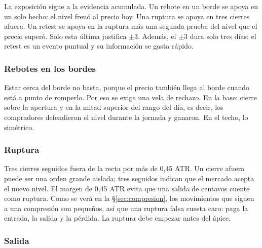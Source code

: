 \documentclass[10pt,a4paper]{article}
\begin{document}
La exposición sigue a la evidencia acumulada. Un rebote en un borde se apoya en un solo
hecho: el nivel frenó al precio hoy. Una ruptura se apoya en tres cierres afuera. Un
retest se apoya en la ruptura más una segunda prueba del nivel que el precio superó.
Solo esta última justifica $\pm3$. Además, el $\pm3$ dura solo tres días: el retest es
un evento puntual y su información se gasta rápido.

\subsubsection{Rebotes en los bordes}

Estar cerca del borde no basta, porque el precio también llega al borde cuando está a
punto de romperlo. Por eso se exige una vela de rechazo. En la base: cierre sobre la
apertura y en la mitad superior del rango del día, es decir, los compradores
defendieron el nivel durante la jornada y ganaron. En el techo, lo simétrico.

\subsubsection{Ruptura}

Tres cierres seguidos fuera de la recta por más de 0,45 ATR. Un cierre afuera puede ser
una orden grande aislada; tres seguidos indican que el mercado acepta el nuevo nivel. El
margen de 0,45 ATR evita que una salida de centavos cuente como ruptura. Como se verá en
la §\ref{sec:compresion}, los movimientos que siguen a una compresión son pequeños, así
que una ruptura falsa cuesta caro: paga la entrada, la salida y la pérdida. La ruptura
debe empezar antes del ápice.

\subsubsection{Salida}
\end{document}
